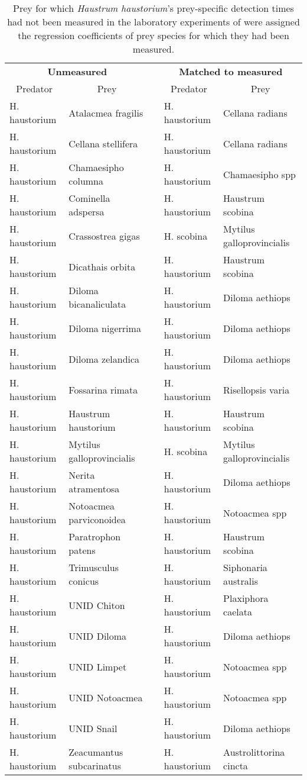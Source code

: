 \begin{table}[!htbp]
\caption{Prey for which \textit{Haustrum haustorium}'s prey-specific detection times had not been measured in the laboratory experiments of \citet{Novak:2013qg} were assigned the regression coefficients of prey species for which they had been measured.\label{tab:matches}} 
\begin{center}
\begin{tabular}{llcll}
\hline
\multicolumn{2}{c}{\bfseries Unmeasured}&\multicolumn{1}{c}{\bfseries }&\multicolumn{2}{c}{\bfseries Matched to measured}\tabularnewline
\cline{1-2} \cline{4-5}
\multicolumn{1}{c}{Predator}&\multicolumn{1}{c}{Prey}&\multicolumn{1}{c}{}&\multicolumn{1}{c}{Predator}&\multicolumn{1}{c}{Prey}\tabularnewline
\hline
H. haustorium&Atalacmea fragilis&&H. haustorium&Cellana radians\tabularnewline
H. haustorium&Cellana stellifera&&H. haustorium&Cellana radians\tabularnewline
H. haustorium&Chamaesipho columna&&H. haustorium&Chamaesipho spp\tabularnewline
H. haustorium&Cominella adspersa&&H. haustorium&Haustrum scobina\tabularnewline
H. haustorium&Crassostrea gigas&&H. scobina&Mytilus galloprovincialis\tabularnewline
H. haustorium&Dicathais orbita&&H. haustorium&Haustrum scobina\tabularnewline
H. haustorium&Diloma bicanaliculata&&H. haustorium&Diloma aethiops\tabularnewline
H. haustorium&Diloma nigerrima&&H. haustorium&Diloma aethiops\tabularnewline
H. haustorium&Diloma zelandica&&H. haustorium&Diloma aethiops\tabularnewline
H. haustorium&Fossarina rimata&&H. haustorium&Risellopsis varia\tabularnewline
H. haustorium&Haustrum haustorium&&H. haustorium&Haustrum scobina\tabularnewline
H. haustorium&Mytilus galloprovincialis&&H. scobina&Mytilus galloprovincialis\tabularnewline
H. haustorium&Nerita atramentosa&&H. haustorium&Diloma aethiops\tabularnewline
H. haustorium&Notoacmea parviconoidea&&H. haustorium&Notoacmea spp\tabularnewline
H. haustorium&Paratrophon patens&&H. haustorium&Haustrum scobina\tabularnewline
H. haustorium&Trimusculus conicus&&H. haustorium&Siphonaria australis\tabularnewline
H. haustorium&UNID Chiton&&H. haustorium&Plaxiphora caelata\tabularnewline
H. haustorium&UNID Diloma&&H. haustorium&Diloma aethiops\tabularnewline
H. haustorium&UNID Limpet&&H. haustorium&Notoacmea spp\tabularnewline
H. haustorium&UNID Notoacmea&&H. haustorium&Notoacmea spp\tabularnewline
H. haustorium&UNID Snail&&H. haustorium&Diloma aethiops\tabularnewline
H. haustorium&Zeacumantus subcarinatus&&H. haustorium&Austrolittorina cincta\tabularnewline
\hline
\end{tabular}\end{center}
\end{table}
